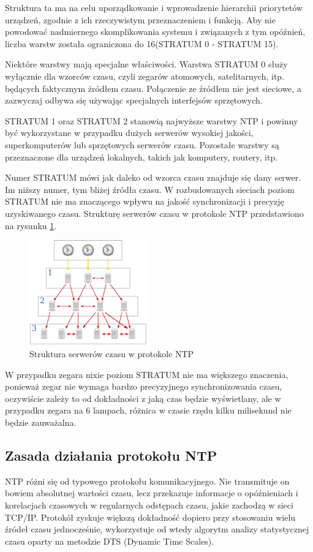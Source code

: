\documentclass[../main.tex]{subfiles}
\begin{document}
Struktura ta ma na celu uporządkowanie i wprowadzenie hierarchii priorytetów urządzeń, zgodnie z ich rzeczywistym przeznaczeniem i funkcją. 
Aby nie powodować nadmiernego skomplikowania systemu i związanych z tym opóźnień, liczba warstw została ograniczona do 16(STRATUM 0 - STRATUM 15).

Niektóre warstwy mają specjalne właściwości. Warstwa STRATUM 0 służy wyłącznie dla wzorców czasu, czyli zegarów atomowych, satelitarnych, itp. będących faktycznym źródłem czasu.
Połączenie ze źródłem nie jest sieciowe, a zazwyczaj odbywa się używając specjalnych interfejsów sprzętowych.

STRATUM 1 oraz STRATUM 2 stanowią najwyższe warstwy NTP i powinny być wykorzystane w przypadku dużych serwerów
wysokiej jakości, superkomputerów lub sprzętowych serwerów czasu.
Pozostałe warstwy są przeznaczone dla urządzeń lokalnych, takich jak komputery, routery, itp.

Numer STRATUM mówi jak daleko od wzorca czasu znajduje się dany serwer. Im niższy numer, tym bliżej źródła czasu. 
W rozbudowanych sieciach poziom STRATUM nie ma znaczącego wpływu na jakość synchronizacji i precyzję uzyskiwanego czasu.
Strukturę serwerów czasu w protokole NTP przedstawiono na rysunku \ref{fig:serwers}.

\begin{figure}[H]
  \centering
  \includegraphics[width=0.45\textwidth]{serwers.png}
  \caption{Struktura serwerów czasu w protokole 
  NTP \cite{st:serwerczasu-jpg}}
  \label{fig:serwers}
\end{figure}

W przypadku zegara nixie poziom STRATUM nie ma większego znaczenia, ponieważ zegar nie wymaga bardzo precyzyjnego synchronizowania czasu, oczywiście zależy to 
od dokładności z jaką czas będzie wyświetlany, ale w przypadku zegara na 6 lampach, różnica w czasie rzędu kilku milisekund nie będzie zauważalna.

\subsection{Zasada działania protokołu NTP}
NTP różni się od typowego protokołu komunikacyjnego. 
Nie transmituje on bowiem absolutnej wartości czasu, lecz przekazuje informacje o opóźnieniach i korelacjach czasowych w regularnych odstępach czasu, jakie zachodzą w sieci TCP/IP. 
Protokół zyskuje większą dokładność dopiero przy stosowaniu wielu źródeł czasu jednocześnie, wykorzystuje od wtedy algorytm analizy statystycznej czasu oparty na metodzie DTS (Dynamic Time Scales).
\end{document}
